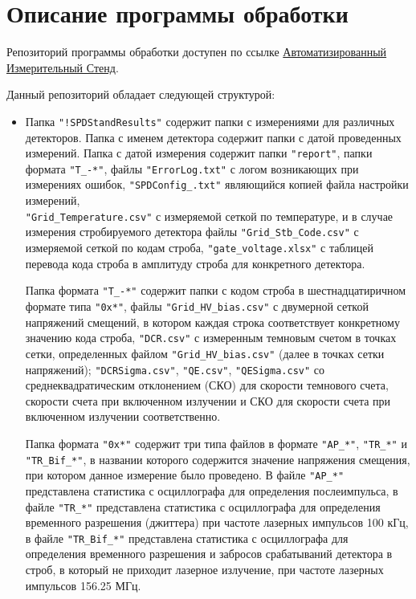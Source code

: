 \documentclass[12pt]{article}
\begin{document}
\section{Описание программы обработки}

Репозиторий программы обработки доступен по ссылке \href{https://github.com/akoziy98/Automated_Stand}{Автоматизированный Измерительный Стенд}. 

Данный репозиторий обладает следующей структурой: 
\begin{itemize}
   \item Папка \verb|"!SPDStandResults"| содержит папки с измерениями для различных детекторов. Папка с именем детектора содержит папки с датой проведенных измерений. Папка с датой измерения содержит папки \verb|"report"|, папки формата \verb|"T_-*"|, файлы \verb|"ErrorLog.txt"| с логом возникающих при измерениях ошибок, \verb|"SPDConfig_.txt"| являющийся копией файла настройки измерений, \\ \verb|"Grid_Temperature.csv"| с измеряемой сеткой по температуре, и в случае измерения стробируемого детектора файлы \verb|"Grid_Stb_Code.csv"| с измеряемой сеткой по кодам строба, \verb|"gate_voltage.xlsx"| с таблицей перевода кода строба в амплитуду строба для конкретного детектора. 
   
   Папка формата \verb|"T_-*"| содержит папки с кодом строба в шестнадцатиричном формате типа \verb|"0x*"|, файлы \verb|"Grid_HV_bias.csv"| с двумерной сеткой напряжений смещений, в котором каждая строка соответствует конкретному значению кода строба,  \verb|"DCR.csv"| с измеренным темновым счетом в точках сетки, определенных файлом \verb|"Grid_HV_bias.csv"| (далее в точках сетки напряжений); \verb|"DCRSigma.csv"|, \verb|"QE.csv"|, \verb|"QESigma.csv"| со среднеквадратическим отклонением (СКО) для скорости темнового счета, скорости счета при включенном излучении и СКО для скорости счета при включенном излучении соответственно. 
   
   Папка формата \verb|"0x*"| содержит три типа файлов в формате \verb|"AP_*"|, \verb|"TR_*"| и \verb|"TR_Bif_*"|, в названии которого содержится значение напряжения смещения, при котором данное измерение было проведено. В файле  \verb|"AP_*"| представлена статистика с осциллографа для определения послеимпульса, в файле  \verb|"TR_*"| представлена статистика с осциллографа для определения временного разрешения (джиттера) при частоте лазерных импульсов 100 кГц, в файле \verb|"TR_Bif_*"| представлена статистика с осциллографа для определения временного разрешения и забросов срабатываний детектора в строб, в который не приходит лазерное излучение, при частоте лазерных импульсов 156.25 МГц.


\end{itemize}
\end{document}
